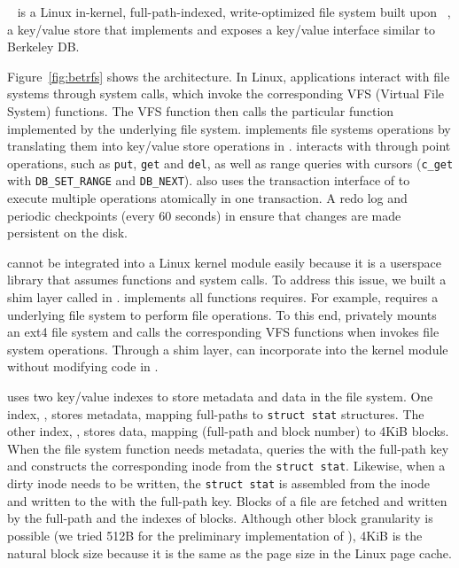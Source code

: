 \betrfs~\citep{betrfs1,betrfs1tos} is a Linux in-kernel, full-path-indexed,
write-optimized file system built upon \fti~\citep{fti},
a key/value store that implements \bets and
exposes a key/value interface similar to Berkeley DB.

Figure~\ref{fig:betrfs} shows the \betrfs architecture.
In Linux, applications interact with file systems through system calls,
which invoke the corresponding VFS (Virtual File System) functions.
The VFS function then calls the particular function implemented by
the underlying file system.
\betrfs implements file systems operations by translating them into key/value
store operations in \fti.
\betrfs interacts with \fti through point operations, such as \texttt{put},
\texttt{get} and \texttt{del}, as well as range queries with cursors
(\texttt{c\_get} with \texttt{DB\_SET\_RANGE} and \texttt{DB\_NEXT}).
\betrfs also uses the transaction interface of \fti to execute multiple
operations atomically in one transaction.
A redo log and periodic checkpoints (every 60 seconds) in \fti ensure that
changes are made persistent on the disk.

\Fti cannot be integrated into a Linux kernel module easily because
it is a userspace library that assumes \libc functions and system calls.
To address this issue, we built a shim layer called \klibc in \betrfs.
\Klibc implements all functions \fti requires.
For example, \fti requires a underlying file system to perform file operations.
To this end, \klibc privately mounts an ext4 file system and calls the
corresponding VFS functions when \fti invokes file system operations.
Through a shim layer, \betrfs can incorporate \fti into the kernel module
without modifying code in \fti.

\betrfs uses two key/value indexes to store metadata and data in the file
system.
One index, \mdb, stores metadata, mapping full-paths to \texttt{struct stat}
structures.
The other index, \ddb, stores data, mapping (full-path and block number) to
4KiB blocks.
When the file system function needs metadata, \betrfs queries
the \mdb with the full-path key and constructs the corresponding inode
from the \texttt{struct stat}.
Likewise, when a dirty inode needs to be written, the \texttt{struct stat} is
assembled from the inode and written to the \mdb with the
full-path key.
Blocks of a file are fetched and written by the full-path and the indexes of
blocks.
Although other block granularity is possible (we tried 512B for the preliminary
implementation of \betrfs), 4KiB is the natural block size
because it is the same as the page size in the Linux page cache.

